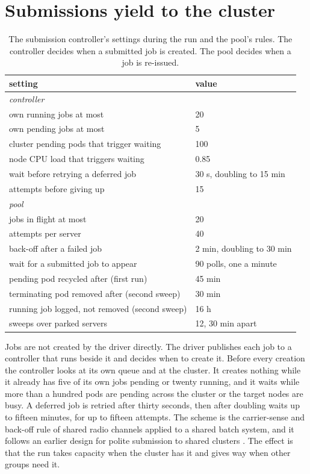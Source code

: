 \documentclass[sigconf, nonacm]{acmart}
\begin{document}
\section{Submissions yield to the cluster}
\label{sec:controller}

\begin{table}[t]
\caption{The submission controller's settings during the run and the pool's rules. The controller
decides when a submitted job is created. The pool decides when a job is re-issued.}
\label{tab:rules}
\centering
\small
\setlength{\tabcolsep}{3pt}
\begin{tabular}{@{}p{}p{}@{}}
\toprule
setting & value \\
\midrule
\multicolumn{2}{l}{\emph{controller}} \\
own running jobs at most & 20 \\
own pending jobs at most & 5 \\
cluster pending pods that trigger waiting & 100 \\
node CPU load that triggers waiting & 0.85 \\
wait before retrying a deferred job & 30 s, doubling to 15 min \\
attempts before giving up & 15 \\
\multicolumn{2}{l}{\emph{pool}} \\
jobs in flight at most & 20 \\
attempts per server & 40 \\
back-off after a failed job & 2 min, doubling to 30 min \\
wait for a submitted job to appear & 90 polls, one a minute \\
pending pod recycled after (first run) & 45 min \\
terminating pod removed after (second sweep) & 30 min \\
running job logged, not removed (second sweep) & 16 h \\
sweeps over parked servers & 12, 30 min apart \\
\bottomrule
\end{tabular}
\end{table}

Jobs are not created by the driver directly. The driver publishes each job to a controller
\cite{natsbursting} that runs beside it and decides when to create it. Before every creation the
controller looks at its own queue and at the cluster. It creates nothing while it already has five
of its own jobs pending or twenty running, and it waits while more than a hundred pods are pending
across the cluster or the target nodes are busy. A deferred job is retried after thirty seconds,
then after doubling waits up to fifteen minutes, for up to fifteen attempts. The scheme is the
carrier-sense and back-off rule of shared radio channels applied to a shared batch system, and it
follows an earlier design for polite submission to shared clusters \cite{politesubmit}. The effect
is that the run takes capacity when the cluster has it and gives way when other groups need it.
\end{document}
